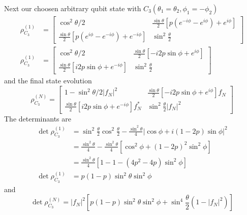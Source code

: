\documentclass[../../../main.tex]{subfiles}
\begin{document}
Next our choosen arbitrary qubit state with $C_3(\theta_1=\theta_2,\phi_1=-\phi_2)$
\begin{align*}
  \rho^{(1)}_{C_3}  & =
  \begin{bmatrix}
    \cos ^2 \theta/2                                                               & \frac{\sin \theta  }{2} \left[p(e^{-i\phi}-e^{i\phi}) + e^{i\phi}  \right] \\
    \frac{\sin \theta  }{2} \left[p(e^{i\phi} - e^{-i\phi} ) + e^{-i\phi}  \right] & \sin ^2 \frac{\theta  }{2}
  \end{bmatrix} \\
  \rho ^{(1)}_{C_3} & =
  \begin{bmatrix}
    \cos ^2 \theta/2                                                 & \frac{\sin \theta}{2} \left[-i2p \sin \phi + e^{i\phi}  \right] \\
    \frac{\sin \theta  }{2} \left[i2p \sin\phi + e^{-i\phi}  \right] & \sin ^2 \frac{\theta  }{2}
  \end{bmatrix}
\end{align*}
and the final state evolution
\begin{equation*}
  \rho ^{(N)}_{C_3}  =
  \begin{bmatrix}
    1- \sin^2 \theta/2 |f_N|^2                                             & \frac{\sin \theta}{2} \left[-i2p \sin \phi + e^{i\phi}  \right]f_N \\
    \frac{\sin \theta  }{2} \left[i2p \sin\phi + e^{-i\phi}  \right]f_N ^* & \sin ^2 \frac{\theta  }{2}|f_N|^2
  \end{bmatrix}
\end{equation*}
The determinants are
\begin{align*}
  \det\rho^{(1)}_{C_3}
                         & =
  \sin^2\frac{\theta}{2}\cos^2\frac{\theta}{2}
  -
  \frac{\sin^2\theta}{4}
  \left| \cos \phi+ i(1-2p) \sin \phi\right|^2 \\
                         & =
  \frac{\sin^2\theta}{4}
  -\frac{\sin^2\theta}{4}
  \left[
    \cos^2\phi
    +(1-2p)^2\sin^2 \phi
  \right]                                      \\
                         & =
  \frac{\sin^2\theta}{4}
  \left[
    1-1-
    (4p^2-4p)\sin^2\phi
  \right]                                      \\
  \det \rho ^{(1)}_{C_3} & =
  p(1-p)\sin ^2\theta \sin^2 \phi
\end{align*}
and
\begin{equation*}
  \det \rho ^{(N)}_{C_3} =     |f_N|^2 \left[  p(1-p)\sin ^2\theta \sin^2 \phi + \sin^4 \frac{\theta}{2} (1-|f_N|^2)\right]
\end{equation*}
\end{document}

